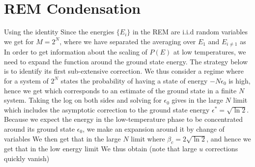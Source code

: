 \documentclass[letterpaper,english,10pt]{article}
\begin{document}
\section{REM Condensation}
\label{appendix:Condensation}
Using the identity 
Since the energies $\{E_i\}$ in the REM  are i.i.d random variables we get for $M = 2^N$,
where we have separated the averaging over $E_1$ and $E_{i \neq1}$ as 
In order to get information about the scaling of $P(E)$ at low temperatures, 
we need to expand the function around the ground state energy. 
The strategy below is to identify its first sub-extensive correction. 
We thus consider a regime where for a system of $2^N$ states the probability of having a state of energy $-N\epsilon_0$ is high, hence we get 
which corresponds to an estimate of the ground state in a finite $N$ system. 
Taking the log on both sides and solving for $\epsilon_0$ gives in the large $N$ limit 
 which includes the asymptotic correction to the ground state energy $\epsilon^\ast = \sqrt{\ln 2}$. 
Because we expect the energy in the low-temperature phase to be concentrated around its ground
state $\epsilon_0$, we make an expansion around it by change of variables 
We then get that in the large $N$ limit 
where $\beta_c = 2\sqrt{\ln2}$, and hence we get that in the low energy limit 
We thus obtain (note that large $u$ corrections quickly vanish) 
\end{document}
